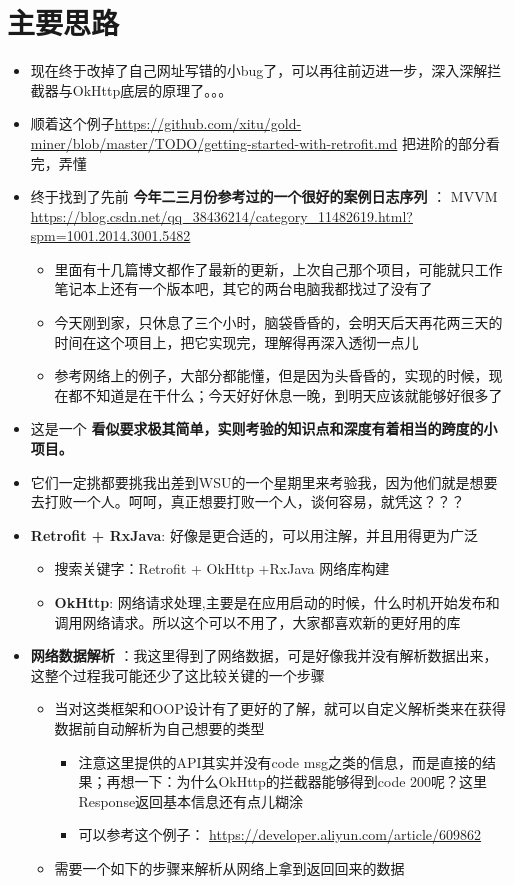 \documentclass[9pt, b5paper]{article}
\begin{document}
\section{主要思路}
\label{sec-2}
\begin{itemize}
\item 现在终于改掉了自己网址写错的小bug了，可以再往前迈进一步，深入深解拦截器与OkHttp底层的原理了。。。
\item 顺着这个例子\url{https://github.com/xitu/gold-miner/blob/master/TODO/getting-started-with-retrofit.md} 把进阶的部分看完，弄懂
\item 终于找到了先前 \textbf{今年二三月份参考过的一个很好的案例日志序列} ： MVVM \url{https://blog.csdn.net/qq_38436214/category_11482619.html?spm=1001.2014.3001.5482}
\begin{itemize}
\item 里面有十几篇博文都作了最新的更新，上次自己那个项目，可能就只工作笔记本上还有一个版本吧，其它的两台电脑我都找过了没有了
\item 今天刚到家，只休息了三个小时，脑袋昏昏的，会明天后天再花两三天的时间在这个项目上，把它实现完，理解得再深入透彻一点儿
\item 参考网络上的例子，大部分都能懂，但是因为头昏昏的，实现的时候，现在都不知道是在干什么；今天好好休息一晚，到明天应该就能够好很多了
\end{itemize}
\item 这是一个 \textbf{看似要求极其简单，实则考验的知识点和深度有着相当的跨度的小项目。}
\item 它们一定挑都要挑我出差到WSU的一个星期里来考验我，因为他们就是想要去打败一个人。呵呵，真正想要打败一个人，谈何容易，就凭这？？？
\item \textbf{Retrofit + RxJava}: 好像是更合适的，可以用注解，并且用得更为广泛
\begin{itemize}
\item 搜索关键字：Retrofit + OkHttp +RxJava 网络库构建
\item \textbf{OkHttp}: 网络请求处理,主要是在应用启动的时候，什么时机开始发布和调用网络请求。所以这个可以不用了，大家都喜欢新的更好用的库
\end{itemize}
\item \textbf{网络数据解析} ：我这里得到了网络数据，可是好像我并没有解析数据出来，这整个过程我可能还少了这比较关键的一个步骤
\begin{itemize}
\item 当对这类框架和OOP设计有了更好的了解，就可以自定义解析类来在获得数据前自动解析为自己想要的类型
\begin{itemize}
\item 注意这里提供的API其实并没有code msg之类的信息，而是直接的结果；再想一下：为什么OkHttp的拦截器能够得到code 200呢？这里Response返回基本信息还有点儿糊涂
\item 可以参考这个例子： \url{https://developer.aliyun.com/article/609862}
\end{itemize}
\item 需要一个如下的步骤来解析从网络上拿到返回回来的数据
\end{itemize}
\end{itemize}
\end{document}
